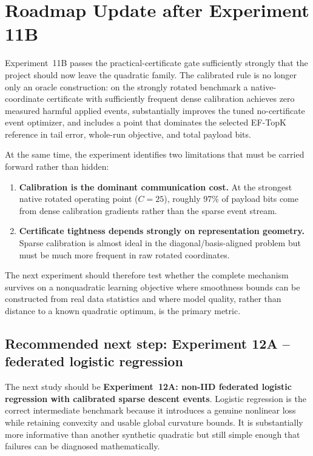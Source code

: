 \section{Roadmap Update after Experiment 11B}
\label{sec:roadmap-post-11b}

Experiment~11B passes the practical-certificate gate sufficiently strongly that the project should now leave the quadratic family. The calibrated rule is no longer only an oracle construction: on the strongly rotated benchmark a native-coordinate certificate with sufficiently frequent dense calibration achieves zero measured harmful applied events, substantially improves the tuned no-certificate event optimizer, and includes a point that dominates the selected EF-TopK reference in tail error, whole-run objective, and total payload bits.

At the same time, the experiment identifies two limitations that must be carried forward rather than hidden:
\begin{enumerate}
  \item \textbf{Calibration is the dominant communication cost.} At the strongest native rotated operating point ($C=25$), roughly 97\% of payload bits come from dense calibration gradients rather than the sparse event stream.
  \item \textbf{Certificate tightness depends strongly on representation geometry.} Sparse calibration is almost ideal in the diagonal/basis-aligned problem but must be much more frequent in raw rotated coordinates.
\end{enumerate}
The next experiment should therefore test whether the complete mechanism survives on a nonquadratic learning objective where smoothness bounds can be constructed from real data statistics and where model quality, rather than distance to a known quadratic optimum, is the primary metric.

\subsection{Recommended next step: Experiment 12A -- federated logistic regression}

The next study should be \textbf{Experiment~12A: non-IID federated logistic regression with calibrated sparse descent events}. Logistic regression is the correct intermediate benchmark because it introduces a genuine nonlinear loss while retaining convexity and usable global curvature bounds. It is substantially more informative than another synthetic quadratic but still simple enough that failures can be diagnosed mathematically.

